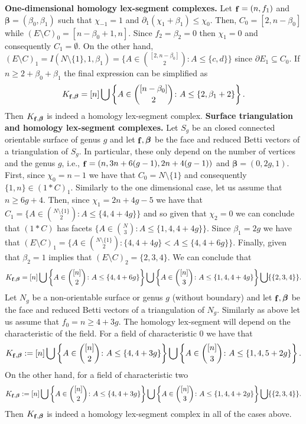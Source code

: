 \documentclass[11pt]{article}
\numberwithin{claimcounter}{theorem}
\theoremstyle{remark}
\theoremstyle{definition}
\numberwithin{theorem}{section}
\DeclareMathOperator{\fvec}{\bf f}
\newcommand{\bbeta}{\boldsymbol{\beta}}
\begin{document}
%
\noindent
{\bf One-dimensional homology lex-segment complexes.}
Let $\fvec=(n,f_1)$ and $\bbeta=(\beta_0,\beta_1)$ such that $\chi_{-1} = 1$ and $\partial_1(\chi_1+\beta_1)\leq \chi_0$.
Then, $C_0=[2,n-\beta_0]$ while $(E\setminus C)_0=[n-\beta_0+1,n]$.
Since $f_2=\beta_2=0$ then $\chi_1=0$ and consequently $C_1=\emptyset$. 
On the other hand, $(E\setminus C)_1 = I(N\setminus \{1\},1,\beta_1) = \{A \in \binom{[2,n-\beta_0]}{2} \colon A \leq \{c,d\}\}$ since $\partial E_1 \subseteq C_0$.
If $n \geq 2 + \beta_0 + \beta_1$ the final expression can be simplified as
\begin{equation}
  \label{eq:hseggraph}
  K_{\fvec,\bbeta} =  [n] \bigcup \left \{ A \in \binom{[n-\beta_0]}{2} \colon A \leq \{2,\beta_1+2\} \right \}.
\end{equation}
Then $K_{\fvec,\bbeta}$ is indeed a homology lex-segment complex.
%
\noindent
{\bf Surface triangulation and homology lex-segment complexes.}
Let $S_g$ be an closed connected orientable surface of genus $g$ and let $\fvec,\bbeta$ be the face and reduced Betti vectors of a triangulation of $S_g$. 
In particular, these only depend on the number of vertices and the genus $g$, i.e., $\fvec=(n,3n+6(g-1),2n+4(g-1))$ and $\bbeta=(0,2g,1)$.
First, since $\chi_0=n-1$ we have that $C_0=N\setminus \{1\}$ and consequently $\{1,n\}\in (1*C)_1$.
Similarly to the 
one dimensional case,
let us assume that $n\geq 6g+4$.
Then, since $\chi_1 = 2n+4g-5$ we have that $C_1 = \{A \in \binom{N\setminus \{1\}}{2} \colon A \leq \{4,4+4g\}\}$ and so given that $\chi_2=0$ we can conclude that $(1*C)$ has facets $\{A \in \binom{N}{3} \colon A \leq \{1,4,4+4g\}\}$.
%
Since $\beta_1=2g$ we have that $(E\setminus C)_1=\{A \in \binom{N\setminus \{1\}}{2}\colon \{4,4+4g\} < A \leq \{4,4+6g\}\}$. Finally, given that $\beta_2=1$ implies that $(E\setminus C)_2=\{2,3,4\}$. We can conclude that
\begin{equation}
\label{eq:hsegsrf}
K_{\fvec,\bbeta} = [n] \bigcup \left \{A \in \binom{[n]}{2}\colon A \leq \{4,4+6g\} \right \} \bigcup \left \{ A \in \binom{[n]}{3} \colon A \leq \{1,4,4+4g\} \right \} \bigcup \{\{2,3,4\}\}.
\end{equation}
%
Let $N_g$ be a non-orientable surface or genus $g$ (without boundary) and let $\fvec,\bbeta$ be the face and reduced Betti vectors of a triangulation of $N_g$.
Similarly as above let us assume that $f_0=n\geq 4+3g$.
The homology lex-segment will depend on the characteristic of the field. For a field of characteristic $0$ we have that
$$K_{\fvec,\bbeta}:= [n] \bigcup \left \{A \in \binom{[n]}{2}\colon A \leq \{4,4+3g\} \right \} \bigcup \left \{ A \in \binom{[n]}{3} \colon A \leq \{1,4,5+2g\} \right \}.$$
On the other hand, for a field of characteristic two
$$K_{\fvec,\bbeta}:= [n] \bigcup \left \{A\in \binom{[n]}{2}\colon A \leq \{4,4+3g\} \right \} \bigcup \left \{ A \in \binom{[n]}{3} \colon A \leq \{1,4,4+2g\} \right \} \bigcup \{\{2,3,4\}\}.$$
Then $K_{\fvec,\bbeta}$ is indeed a homology lex-segment complex in all of the cases above.
%
%
%
%
\end{document}
